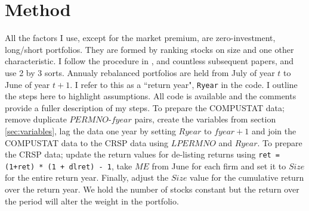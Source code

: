 
\section{Method}

All the factors I use, except for the market premium, are zero-investment, long/short 
portfolios.
They are formed by ranking stocks on size and one other characteristic.
I follow the procedure in \textcite{fama1992cross}, and countless subsequent papers, and use 2 
by 3 sorts.
Annualy rebalanced portfolios are held from July of year $t$ to June of year $t+1$.
I refer to this as a ``return year", \texttt{Ryear} in the code.
I outline the steps here to highlight assumptions.
All code is available and the comments provide a fuller description of my steps.
To prepare the COMPUSTAT data; remove duplicate $PERMNO$-$fyear$ pairs, create the variables 
from section \ref{sec:variables}, lag the data one year by setting $Ryear$ to $fyear+1$ and 
join the COMPUSTAT data to the CRSP data using $LPERMNO$ and $Ryear$.
To prepare the CRSP data; update the return values for de-listing returns using \texttt{ret = 
(1+ret) * (1 + dlret) - 1}, take $ME$ from June for each firm and set it to $Size$ for the 
entire return year. Finally, adjust the $Size$ value for the cumulative return over the return 
year. We hold the number of stocks constant but the return over the period will alter the 
weight in the portfolio.